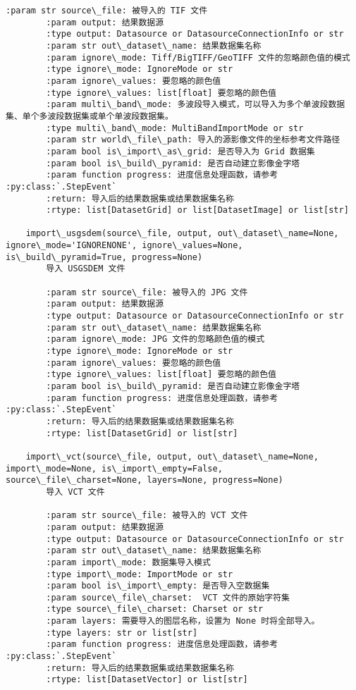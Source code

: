 \documentclass[11pt]{article}
\begin{document}
\begin{Verbatim}[commandchars=\\\{\}]
        :param str source\_file: 被导入的 TIF 文件
        :param output: 结果数据源
        :type output: Datasource or DatasourceConnectionInfo or str
        :param str out\_dataset\_name: 结果数据集名称
        :param ignore\_mode: Tiff/BigTIFF/GeoTIFF 文件的忽略颜色值的模式
        :type ignore\_mode: IgnoreMode or str
        :param ignore\_values: 要忽略的颜色值
        :type ignore\_values: list[float] 要忽略的颜色值
        :param multi\_band\_mode: 多波段导入模式，可以导入为多个单波段数据集、单个多波段数据集或单个单波段数据集。
        :type multi\_band\_mode: MultiBandImportMode or str
        :param str world\_file\_path: 导入的源影像文件的坐标参考文件路径
        :param bool is\_import\_as\_grid: 是否导入为 Grid 数据集
        :param bool is\_build\_pyramid: 是否自动建立影像金字塔
        :param function progress: 进度信息处理函数，请参考 :py:class:`.StepEvent`
        :return: 导入后的结果数据集或结果数据集名称
        :rtype: list[DatasetGrid] or list[DatasetImage] or list[str]
    
    import\_usgsdem(source\_file, output, out\_dataset\_name=None, ignore\_mode='IGNORENONE', ignore\_values=None, is\_build\_pyramid=True, progress=None)
        导入 USGSDEM 文件
        
        :param str source\_file: 被导入的 JPG 文件
        :param output: 结果数据源
        :type output: Datasource or DatasourceConnectionInfo or str
        :param str out\_dataset\_name: 结果数据集名称
        :param ignore\_mode: JPG 文件的忽略颜色值的模式
        :type ignore\_mode: IgnoreMode or str
        :param ignore\_values: 要忽略的颜色值
        :type ignore\_values: list[float] 要忽略的颜色值
        :param bool is\_build\_pyramid: 是否自动建立影像金字塔
        :param function progress: 进度信息处理函数，请参考 :py:class:`.StepEvent`
        :return: 导入后的结果数据集或结果数据集名称
        :rtype: list[DatasetGrid] or list[str]
    
    import\_vct(source\_file, output, out\_dataset\_name=None, import\_mode=None, is\_import\_empty=False, source\_file\_charset=None, layers=None, progress=None)
        导入 VCT 文件
        
        :param str source\_file: 被导入的 VCT 文件
        :param output: 结果数据源
        :type output: Datasource or DatasourceConnectionInfo or str
        :param str out\_dataset\_name: 结果数据集名称
        :param import\_mode: 数据集导入模式
        :type import\_mode: ImportMode or str
        :param bool is\_import\_empty: 是否导入空数据集
        :param source\_file\_charset:  VCT 文件的原始字符集
        :type source\_file\_charset: Charset or str
        :param layers: 需要导入的图层名称，设置为 None 时将全部导入。
        :type layers: str or list[str]
        :param function progress: 进度信息处理函数，请参考 :py:class:`.StepEvent`
        :return: 导入后的结果数据集或结果数据集名称
        :rtype: list[DatasetVector] or list[str]


\end{Verbatim}
\end{document}

